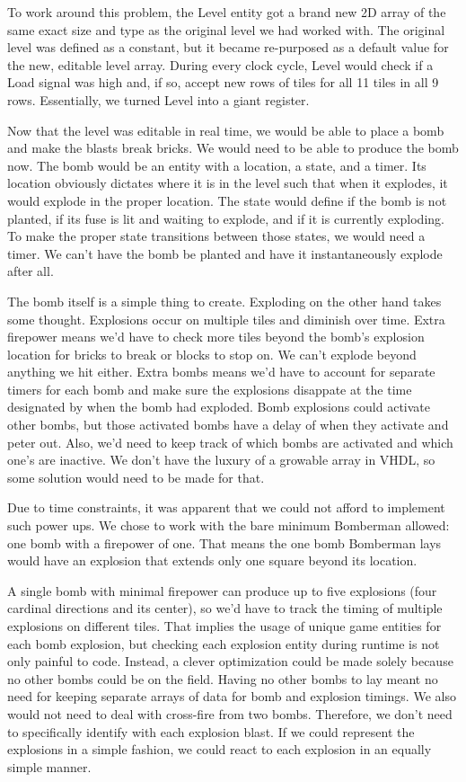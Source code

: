 \documentclass[10pt,a4paper]{article}
\begin{document}
To work around this problem, the Level entity got a brand new 2D array of the same exact size and type as the original level we had worked with. The original level was defined as a constant, but it became re-purposed as a default value for the new, editable level array. During every clock cycle, Level would check if a Load signal was high and, if so, accept new rows of tiles for all 11 tiles in all 9 rows. Essentially, we turned Level into a giant register.

Now that the level was editable in real time, we would be able to place a bomb and make the blasts break bricks. We would need to be able to produce the bomb now. The bomb would be an entity with a location, a state, and a timer. Its location obviously dictates where it is in the level such that when it explodes, it would explode in the proper location. The state would define if the bomb is not planted, if its fuse is lit and waiting to explode, and if it is currently exploding. To make the proper state transitions between those states, we would need a timer. We can't have the bomb be planted and have it instantaneously explode after all.

The bomb itself is a simple thing to create. Exploding on the other hand takes some thought. Explosions occur on multiple tiles and diminish over time. Extra firepower means we'd have to check more tiles beyond the bomb's explosion location for bricks to break or blocks to stop on. We can't explode beyond anything we hit either. Extra bombs means we'd have to account for separate timers for each bomb and make sure the explosions disappate at the time designated by when the bomb had exploded. Bomb explosions could activate other bombs, but those activated bombs have a delay of when they activate and peter out. Also, we'd need to keep track of which bombs are activated and which one's are inactive. We don't have the luxury of a growable array in VHDL, so some solution would need to be made for that.

Due to time constraints, it was apparent that we could not afford to implement such power ups. We chose to work with the bare minimum Bomberman allowed: one bomb with a firepower of one. That means the one bomb Bomberman lays would have an explosion that extends only one square beyond its location.

A single bomb with minimal firepower can produce up to five explosions (four cardinal directions and its center), so we'd have to track the timing of multiple explosions on different tiles. That implies the usage of unique game entities for each bomb explosion, but checking each explosion entity during runtime is not only painful to code. Instead, a clever optimization could be made solely because no other bombs could be on the field. Having no other bombs to lay meant no need for keeping separate arrays of data for bomb and explosion timings. We also would not need to deal with cross-fire from two bombs. Therefore, we don't need to specifically identify with each explosion blast. If we could represent the explosions in a simple fashion, we could react to each explosion in an equally simple manner.
\end{document}
